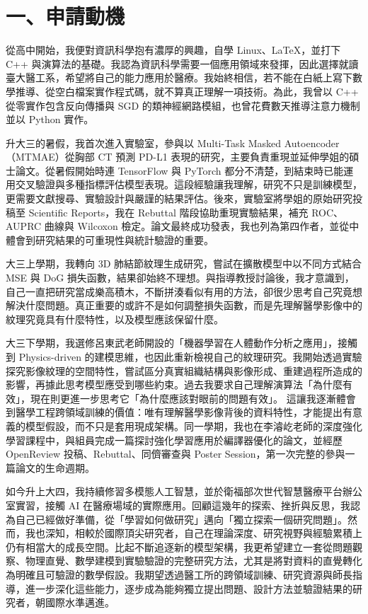 \documentclass[11pt]{article}
\begin{document}
\section*{一、申請動機}
從高中開始，我便對資訊科學抱有濃厚的興趣，自學 Linux、LaTeX，並打下 C++ 與演算法的基礎。我認為資訊科學需要一個應用領域來發揮，因此選擇就讀臺大醫工系，希望將自己的能力應用於醫療。我始終相信，若不能在白紙上寫下數學推導、從空白檔案實作程式碼，就不算真正理解一項技術。為此，我曾以 C++ 從零實作包含反向傳播與 SGD 的類神經網路模組，也曾花費數天推導注意力機制並以 Python 實作。

升大三的暑假，我首次進入實驗室，參與以 Multi-Task Masked Autoencoder（MTMAE）從胸部 CT 預測 PD-L1 表現的研究，主要負責重現並延伸學姐的碩士論文。從暑假開始時連 TensorFlow 與 PyTorch 都分不清楚，到結束時已能運用交叉驗證與多種指標評估模型表現。這段經驗讓我理解，研究不只是訓練模型，更需要文獻搜尋、實驗設計與嚴謹的結果評估。後來，實驗室將學姐的原始研究投稿至 Scientific Reports，我在 Rebuttal 階段協助重現實驗結果，補充 ROC、AUPRC 曲線與 Wilcoxon 檢定。論文最終成功發表，我也列為第四作者，並從中體會到研究結果的可重現性與統計驗證的重要。

大三上學期，我轉向 3D 肺結節紋理生成研究，嘗試在擴散模型中以不同方式結合 MSE 與 DoG 損失函數，結果卻始終不理想。與指導教授討論後，我才意識到，自己一直把研究當成樂高積木，不斷拼湊看似有用的方法，卻很少思考自己究竟想解決什麼問題。真正重要的或許不是如何調整損失函數，而是先理解醫學影像中的紋理究竟具有什麼特性，以及模型應該保留什麼。

大三下學期，我選修呂東武老師開設的「機器學習在人體動作分析之應用」，接觸到 Physics-driven 的建模思維，也因此重新檢視自己的紋理研究。我開始透過實驗探究影像紋理的空間特性，嘗試區分真實組織結構與影像形成、重建過程所造成的影響，再據此思考模型應受到哪些約束。過去我要求自己理解演算法「為什麼有效」，現在則更進一步思考它「為什麼應該對眼前的問題有效」。 這讓我逐漸體會到醫學工程跨領域訓練的價值：唯有理解醫學影像背後的資料特性，才能提出有意義的模型假設，而不只是套用現成架構。同一學期，我也在李濬屹老師的深度強化學習課程中，與組員完成一篇探討強化學習應用於編譯器優化的論文，並經歷 OpenReview 投稿、Rebuttal、同儕審查與 Poster Session，第一次完整的參與一篇論文的生命週期。

如今升上大四，我持續修習多模態人工智慧，並於衛福部次世代智慧醫療平台辦公室實習，接觸 AI 在醫療場域的實際應用。回顧這幾年的探索、挫折與反思，我認為自己已經做好準備，從「學習如何做研究」邁向「獨立探索一個研究問題」。然而，我也深知，相較於國際頂尖研究者，自己在理論深度、研究視野與經驗累積上仍有相當大的成長空間。比起不斷追逐新的模型架構，我更希望建立一套從問題觀察、物理直覺、數學建模到實驗驗證的完整研究方法，尤其是將對資料的直覺轉化為明確且可驗證的數學假設。我期望透過醫工所的跨領域訓練、研究資源與師長指導，進一步深化這些能力，逐步成為能夠獨立提出問題、設計方法並驗證結果的研究者，朝國際水準邁進。
\end{document}
